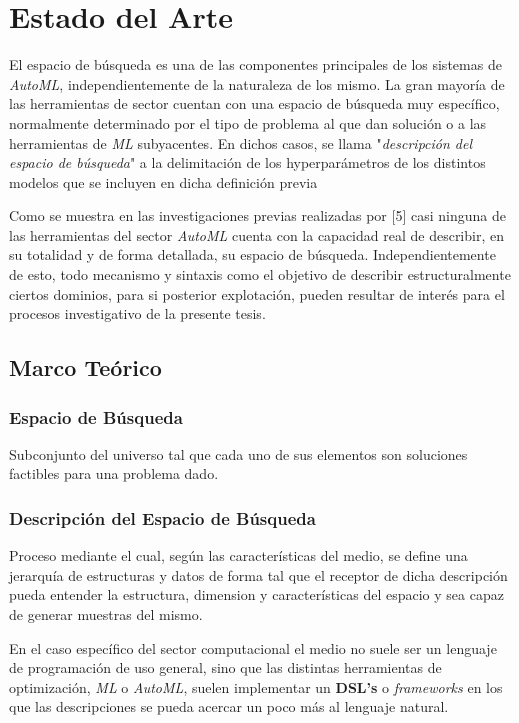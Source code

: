 \chapter{Estado del Arte}\label{chapter:state-of-the-art}


El espacio de búsqueda es una de las componentes principales de los sistemas
de {\it AutoML}, independientemente de la naturaleza de los mismo. La gran mayoría
de las herramientas de sector cuentan con una espacio de búsqueda muy específico,
normalmente determinado por el tipo de problema al que dan solución o a las
herramientas de {\it ML} subyacentes. En dichos casos, se llama "{\it descripción
del espacio de búsqueda}" a la delimitación de los hyperparámetros de los
distintos modelos que se incluyen en dicha definición previa

Como se muestra en las investigaciones previas realizadas por [5] casi ninguna
de las herramientas del sector {\it AutoML} cuenta con la capacidad real de describir,
en su totalidad y de forma detallada, su espacio de búsqueda. Independientemente
de esto, todo mecanismo y sintaxis como el objetivo de describir estructuralmente
ciertos dominios, para si posterior explotación, pueden resultar de interés para
el procesos investigativo de la presente tesis.

\section{Marco Teórico}

\subsection{Espacio de Búsqueda}

Subconjunto del universo tal que cada uno de sus elementos son soluciones factibles
para una problema dado.

\subsection{Descripción del Espacio de Búsqueda}


Proceso mediante el cual, según las características del medio, se define una
jerarquía de estructuras y datos de forma tal que el receptor de dicha descripción
pueda entender la estructura, dimension y características del espacio y sea capaz
de generar muestras del mismo.

En el caso específico del sector computacional el medio no suele ser un lenguaje
de programación de uso general, sino que las distintas herramientas de optimización,
{\it ML} o {\it AutoML}, suelen implementar un {\bf DSL's} o {\it frameworks} en los
que las descripciones se pueda acercar un poco más al lenguaje natural.

